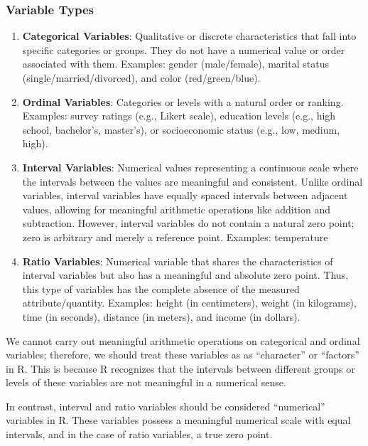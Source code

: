 \documentclass[
]{article}
\begin{document}
\hypertarget{variable-types}{%
\subsubsection{Variable Types}\label{variable-types}}

\begin{enumerate}
\def\labelenumi{\arabic{enumi}.}
\item
  \textbf{Categorical Variables}: Qualitative or discrete characteristics that fall into specific categories or groups. They do not have a numerical value or order associated with them. Examples: gender (male/female), marital status (single/married/divorced), and color (red/green/blue).
\item
  \textbf{Ordinal Variables}: Categories or levels with a natural order or ranking. Examples: survey ratings (e.g., Likert scale), education levels (e.g., high school, bachelor's, master's), or socioeconomic status (e.g., low, medium, high).
\item
  \textbf{Interval Variables}: Numerical values representing a continuous scale where the intervals between the values are meaningful and consistent. Unlike ordinal variables, interval variables have equally spaced intervals between adjacent values, allowing for meaningful arithmetic operations like addition and subtraction. However, interval variables do not contain a natural zero point; zero is arbitrary and merely a reference point. Examples: temperature
\item
  \textbf{Ratio Variables}: Numerical variable that shares the characteristics of interval variables but also has a meaningful and absolute zero point. Thus, this type of variables has the complete absence of the measured attribute/quantity. Examples: height (in centimeters), weight (in kilograms), time (in seconds), distance (in meters), and income (in dollars).
\end{enumerate}

We cannot carry out meaningful arithmetic operations on categorical and ordinal variables; therefore, we should treat these variables as as ``character'' or ``factors'' in R. This is because R recognizes that the intervals between different groups or levels of these variables are not meaningful in a numerical sense.

In contrast, interval and ratio variables should be considered ``numerical'' variables in R. These variables possess a meaningful numerical scale with equal intervals, and in the case of ratio variables, a true zero point.
\end{document}
